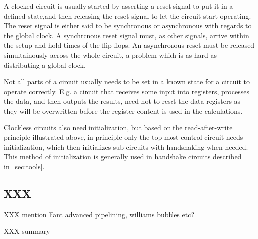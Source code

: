 A clocked circuit is usually started by asserting a reset signal to
put it in a defined state,and then releasing the reset signal to let
the circuit start operating. The reset signal is either said to be
synchronous or asynchronous with regards to the global clock. A
synchronous reset signal must, as other signals, arrive within the
setup and hold times of the flip flops. An asynchronous reset must be
released simultainously across the whole circuit, a problem which is
as hard as distributing a global clock.

Not all parts of a circuit usually needs to be set in a known state
for a circuit to operate correctly. E.g. a circuit that receives some
input into registers, processes the data, and then outputs the
results, need not to reset the data-registers as they will be
overwritten before the register content is used in the calculations.

Clockless circuits also need initialization, but based on the
read-after-write principle illustrated above, in principle only the
top-most control circuit needs initialization, which then initializes
sub circuits with handshaking when needed. This method of
initialization is generally used in handshake circuits described
in~\ref{sec:tools}.

\subsection{XXX}

XXX mention Fant advanced pipelining, williams bubbles etc?

XXX summary
